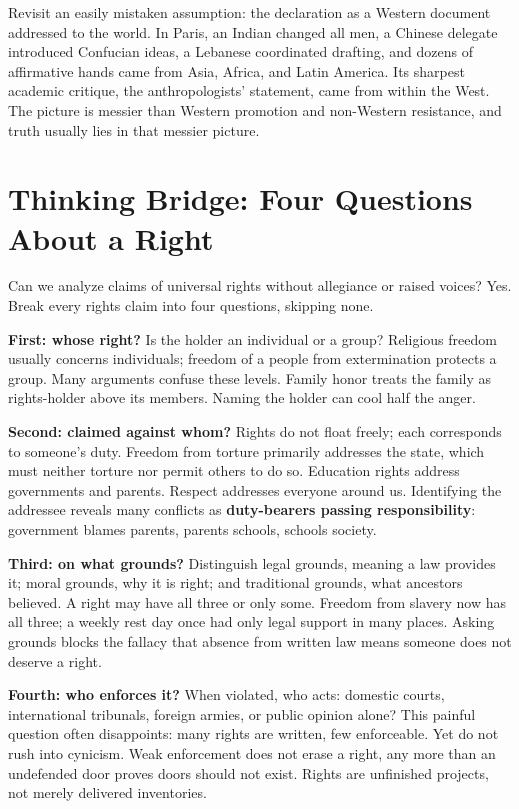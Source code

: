 Revisit an easily mistaken assumption: the declaration as a Western document addressed to the world. In Paris, an Indian changed all men, a Chinese delegate introduced Confucian ideas, a Lebanese coordinated drafting, and dozens of affirmative hands came from Asia, Africa, and Latin America. Its sharpest academic critique, the anthropologists' statement, came from within the West. The picture is messier than Western promotion and non-Western resistance, and truth usually lies in that messier picture.

\section{Thinking Bridge: Four Questions About a Right}
Can we analyze claims of universal rights without allegiance or raised voices? Yes. Break every rights claim into four questions, skipping none.

\textbf{First: whose right?} Is the holder an individual or a group? Religious freedom usually concerns individuals; freedom of a people from extermination protects a group. Many arguments confuse these levels. Family honor treats the family as rights-holder above its members. Naming the holder can cool half the anger.

\textbf{Second: claimed against whom?} Rights do not float freely; each corresponds to someone's duty. Freedom from torture primarily addresses the state, which must neither torture nor permit others to do so. Education rights address governments and parents. Respect addresses everyone around us. Identifying the addressee reveals many conflicts as \textbf{duty-bearers passing responsibility}: government blames parents, parents schools, schools society.

\textbf{Third: on what grounds?} Distinguish legal grounds, meaning a law provides it; moral grounds, why it is right; and traditional grounds, what ancestors believed. A right may have all three or only some. Freedom from slavery now has all three; a weekly rest day once had only legal support in many places. Asking grounds blocks the fallacy that absence from written law means someone does not deserve a right.

\textbf{Fourth: who enforces it?} When violated, who acts: domestic courts, international tribunals, foreign armies, or public opinion alone? This painful question often disappoints: many rights are written, few enforceable. Yet do not rush into cynicism. Weak enforcement does not erase a right, any more than an undefended door proves doors should not exist. Rights are unfinished projects, not merely delivered inventories.

